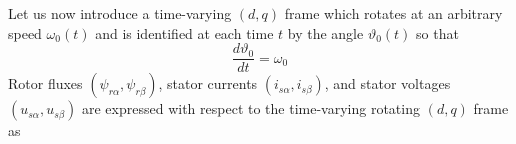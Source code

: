 \documentclass[11pt,a4paper,oneside]{book}
\numberwithin{equation}{section}
\theoremstyle{it}
\theoremstyle{definition}
\begin{document}
Let us now introduce a time-varying $\left(d,q\right)$ frame which rotates at an arbitrary speed $\omega_0(t)$ and is identified at each time $t$ by the angle $\vartheta_0(t)$ so that
\begin{equation}\label{eq54}
	\frac{d\vartheta_0}{dt} = \omega_0
\end{equation}
Rotor fluxes $(\psi_{r\alpha}, \psi_{r\beta})$, stator currents $(i_{s\alpha}, i_{s\beta})$, and stator voltages $(u_{s\alpha}, u_{s\beta})$ are expressed with respect to the time-varying rotating $(d,q)$ frame as 
\end{document}
